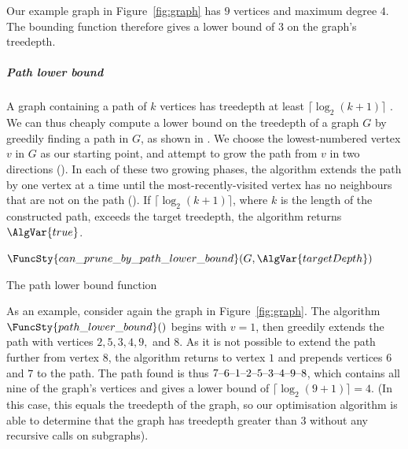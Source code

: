 {    Our example graph in Figure~\ref{fig:graph} has $9$ vertices and maximum degree $4$.
    The bounding function therefore gives a lower bound of 3 on the graph's treedepth.

    \subparagraph*{Path lower bound}

    A graph containing a path of $k$ vertices has treedepth at least
    $\lceil \log_2(k+1)\rceil$ \cite{DBLP:books/daglib/0030491}.  We can thus cheaply
    compute a lower bound on the treedepth of a graph $G$ by greedily
    finding a path in $G$, as shown in .
    We choose the lowest-numbered vertex $v$ in $G$ as our starting point, and
    attempt to grow the path from $v$ in two directions ().
    In each of these two growing phases, the algorithm extends the path
    by one vertex at a time until the most-recently-visited vertex has no
    neighbours that are not on the path ().
    If $\lceil \log_2(k+1)\rceil$, where $k$ is the length of the constructed path,
    exceeds the target treedepth, the algorithm returns $\AlgVar{true}$.

    {
    \begin{algorithm}[h!]
     \footnotesize
    \DontPrintSemicolon
    \newcommand\PathLowerBound{\FuncSty{can\_prune\_by\_path\_lower\_bound}}
    \nl $\PathLowerBound(G, \AlgVar{targetDepth})$ \label{path_lower_bound_fun} \;
    \nl {}
    \caption{The path lower bound function}
    \label{PathLowerBoundAlgorithm}
    \end{algorithm}
    }

    As an example, consider again the graph in Figure~\ref{fig:graph}.  The
    algorithm $\FuncSty{path\_lower\_bound}()$ begins with $v=1$, then greedily
    extends the path with vertices $2, 5, 3, 4, 9,$ and $8$.  As it is not
    possible to extend the path further from vertex $8$, the algorithm returns
    to vertex $1$ and prepends vertices $6$ and $7$ to the path.  The path found
    is thus $7\text{--} 6\text{--} 1\text{--} 2\text{--} 5\text{--} 3\text{--} 4\text{--} 9\text{--} 8$, which contains
    all nine of the graph's vertices and gives a lower bound of $\lceil \log_2(9+1)\rceil = 4$.
    (In this case, this equals the treedepth of the graph, so our optimisation algorithm is
    able to determine that the graph has treedepth greater than 3 without any recursive calls
    on subgraphs).

}
